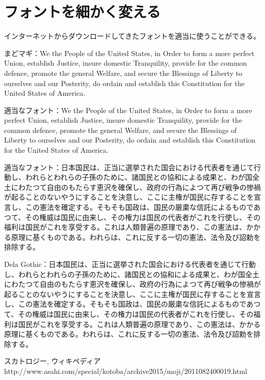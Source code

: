 \documentclass[nomag]{ltjsarticle}
\begin{document}
\section{フォントを細かく変える}
インターネットからダウンロードしてきたフォントを適当に使うことができる。

まどマギ：{\shoujo We the People of the United States, in Order to form a more perfect Union, establish Justice, insure domestic Tranquility, provide for the common defence, promote the general Welfare, and secure the Blessings of Liberty to ourselves and our Posterity, do ordain and establish this Constitution for the United States of America.}

適当なフォント：{\kolker We the People of the United States, in Order to form a more perfect Union, establish Justice, insure domestic Tranquility, provide for the common defence, promote the general Welfare, and secure the Blessings of Liberty to ourselves and our Posterity, do ordain and establish this Constitution for the United States of America.}

適当なフォント：{\rampart 日本国民は、正当に選挙された国会における代表者を通じて行動し、われらとわれらの子孫のために、諸国民との協和による成果と、わが国全土にわたつて自由のもたらす恵沢を確保し、政府の行為によつて再び戦争の惨禍が起ることのないやうにすることを決意し、ここに主権が国民に存することを宣言し、この憲法を確定する。そもそも国政は、国民の厳粛な信託によるものであつて、その権威は国民に由来し、その権力は国民の代表者がこれを行使し、その福利は国民がこれを享受する。これは人類普遍の原理であり、この憲法は、かかる原理に基くものである。われらは、これに反する一切の憲法、法令及び詔勅を排除する。}

Dela Gothic：{\delagoth 日本国民は、正当に選挙された国会における代表者を通じて行動し、われらとわれらの子孫のために、諸国民との協和による成果と、わが国全土にわたつて自由のもたらす恵沢を確保し、政府の行為によつて再び戦争の惨禍が起ることのないやうにすることを決意し、ここに主権が国民に存することを宣言し、この憲法を確定する。そもそも国政は、国民の厳粛な信託によるものであつて、その権威は国民に由来し、その権力は国民の代表者がこれを行使し、その福利は国民がこれを享受する。これは人類普遍の原理であり、この憲法は、かかる原理に基くものである。われらは、これに反する一切の憲法、法令及び詔勅を排除する。}

\begin{thebibliography}{99}
     スカトロジー, ウィキペディア
     http://www.asahi.com/special/kotoba/archive2015/moji/2011082400019.html
\end{thebibliography}
\end{document}
